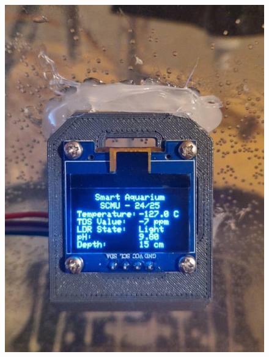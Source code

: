\documentclass[11pt,a4paper]{article}
\begin{document}
\begin{figure}[h!]
    \centering
    \begin{minipage}{0.35\textwidth}
        \centering
        \includegraphics[width=\linewidth]{Images/disp.jpeg}
    \end{minipage}
    \hfill
    \begin{minipage}{0.35\textwidth}
        \centering

\end{minipage}
\end{figure}
\end{document}
